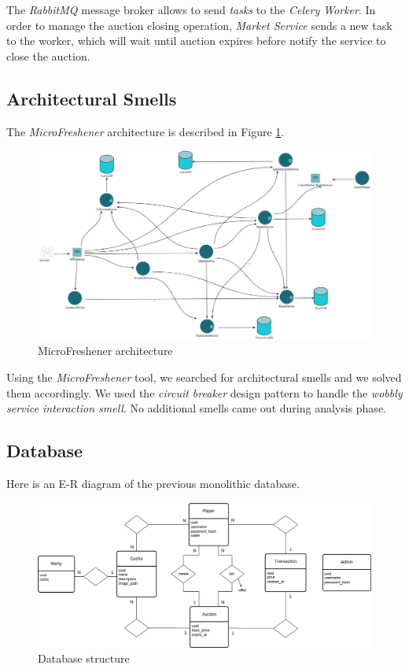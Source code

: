 \documentclass{article}
\begin{document}
The \emph{RabbitMQ} message broker allows to send \emph{tasks} to the \emph{Celery Worker}. In order to manage the auction closing operation, \emph{Market Service} sends a new task to the worker, which will wait until auction expires before notify the service to close the auction.

\subsection{Architectural Smells}
The \emph{MicroFreshener} architecture is described in Figure \ref{fig:microfreshener_architecture}.
\begin{figure}[ht!]
    \centering
    \includegraphics[width=12cm]{microFreshenerArchitecture.png}
    \caption{MicroFreshener architecture}
    \label{fig:microfreshener_architecture}
\end{figure}

Using the \emph{MicroFreshener} tool, we searched for architectural smells and we solved them accordingly. We used the \emph{circuit breaker} design pattern to handle the \emph{wobbly service interaction smell}. No additional smells came out during analysis phase.

\newpage
\subsection{Database}
Here is an E-R diagram of the previous monolithic database.
\begin{figure}[ht]
    \centering
    \includegraphics[width=12cm]{ASE-er-v5.drawio.png}
    \caption{Database structure}
\end{figure}
\end{document}

